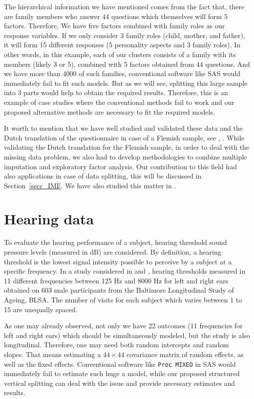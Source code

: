 \documentclass[11pt,a5paper,twoside]{book}
\begin{document}
The hierarchical information we have mentioned comes from the fact that, there are family members who answer 44 questions which themselves will form 5 factors. Therefore, We have five factors combined with family roles as our response variables. If we only consider 3 family roles (child, mother, and father), it will form 15 different responses (5 personality aspects and 3 family roles). In other words, in this example, each of our clusters consists of a family with its members (likely 3 or 5), combined with 5 factors obtained from 44 questions. And we have more than 4000 of such families, conventional software like SAS would immediately fail to fit such models. But as we will see, splitting this large sample into 3 parts would help to obtain the required results. Therefore, this is an example of case studies where the conventional methods fail to work and our proposed alternative methods are necessary to fit the required models.

It worth to mention that we have well studied and validated these data and the Dutch translation of the questionnaire in case of a Flemish sample, see \cite{lovik2017a}, \cite{lovik2017b}. While validating the Dutch translation for the Flemish sample, in order to deal with the missing data problem, we also had to develop methodologies to combine multiple imputation \citep{rubin1987, carpenter2012} and exploratory factor analysis. Our contribution to this field had also applications in case of data splitting, this will be discussed in Section~\ref{secc_IMI}. We have also studied this matter in \cite{lovik2017combining}.



\section{Hearing data} 
\label{mot_hearing}
To evaluate the hearing performance of a subject, hearing threshold sound pressure levels (measured in dB) are considered. By definition, a hearing threshold is the lowest signal intensity possible to perceive by a subject at a specific frequency. In a study considered in \cite{Molenberghs2000} and \cite{Verbeke2006}, hearing thresholds measured in 11 different frequencies between 125 Hz and 8000 Hz for left and right ears obtained on 603 male participants from the Baltimore Longitudinal Study of Ageing, BLSA. The number of visits for each subject which varies between 1 to 15 are unequally spaced. 

As one may already observed, not only we have 22 outcomes (11 frequencies for left and right ears) which should be simultaneously modeled, but the study is also longitudinal. Therefore, one may need both random intercepts and random slopes. That means estimating a $44 \times 44$ covariance matrix of random effects, as well as the fixed effects. Conventional software like {\tt{Proc MIXED}} in SAS would immediately fail to estimate such huge a model, while our proposed structured vertical splitting can deal with the issue and provide necessary estimates and results.
\end{document}
